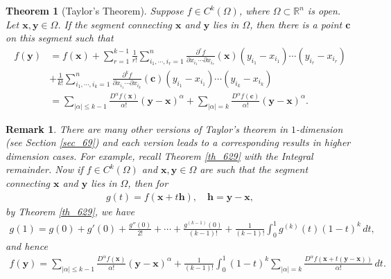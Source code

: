 \documentclass[11pt]{book}
\newtheorem{theorem}{Theorem}[chapter]
\newtheorem{remark}{Remark}[chapter]
\theoremstyle{definition}
\numberwithin{equation}{chapter}
\begin{document}
\begin{theorem}[Taylor's Theorem]\label{th_718}
Suppose $f \in C^k(\Omega)$, where $\Omega \subset \mathbb{R}^n$ is open. Let $\mathbf{x}, \mathbf{y} \in \Omega$. If the segment connecting $\mathbf{x}$ and $\mathbf{y}$ lies in $\Omega$, then there is a point $\mathbf{c}$ on this segment such that
\begin{align*}
    f(\mathbf{y}) & = f(\mathbf{x}) + \sum^{k-1}_{r=1} \frac{1}{r!} \sum^n_{i_1,\cdots,i_r=1} \frac{\partial^r f}{\partial x_{i_1} \cdots \partial x_{i_r}}(\mathbf{x}) (y_{i_1} - x_{i_1}) \cdots (y_{i_r} - x_{i_r}) \\
    & + \frac{1}{k!} \sum^n_{i_1,\cdots,i_k=1} \frac{\partial^k f}{\partial x_{i_1} \cdots \partial x_{i_k}}(\mathbf{c}) (y_{i_1} - x_{i_1}) \cdots (y_{i_k} - x_{i_k}) \\
    & = \sum_{\left|\alpha\right| \leq k - 1} \frac{D^{\alpha} f(\mathbf{x})}{\alpha!} (\mathbf{y} - \mathbf{x})^{\alpha} + \sum_{\left|\alpha\right| = k} \frac{D^{\alpha} f(\mathbf{c})}{\alpha!} (\mathbf{y} - \mathbf{x})^{\alpha}.
\end{align*}
\end{theorem}

\medskip

\begin{remark}
There are many other versions of Taylor's theorem in $1$-dimension (see Section \ref{sec_69}) and each version leads to a corresponding results in higher dimension cases. For example, recall Theorem \ref{th_629} with the Integral remainder. Now if $f \in C^k(\Omega)$ and $\mathbf{x}, \mathbf{y} \in \Omega$ are such that the segment connecting $\mathbf{x}$ and $\mathbf{y}$ lies in $\Omega$, then for
\begin{align*}
    g(t) = f(\mathbf{x} + t\mathbf{h}),  \quad \mathbf{h} = \mathbf{y} - \mathbf{x},
\end{align*}
by Theorem \ref{th_629}, we have
\begin{align*}
    g(1) = g(0) + g'(0) + \frac{g''(0)}{2!} + \cdots + \frac{g^{(k-1)}(0)}{(k-1)!} + \frac{1}{(k-1)!} \int^1_0 g^{(k)}(t) (1 - t)^k \,dt,
\end{align*}
and hence
\begin{align*}
    f(\mathbf{y}) = \sum_{\left|\alpha\right| \leq k - 1} \frac{D^{\alpha} f(\mathbf{x})}{\alpha!} (\mathbf{y} - \mathbf{x})^{\alpha} + \frac{1}{(k-1)!} \int^1_0 (1 - t)^k \sum_{\left|\alpha\right| = k} \frac{D^{\alpha} f(\mathbf{x} + t(\mathbf{y} - \mathbf{x}))}{\alpha!} \,dt.
\end{align*}
\end{remark}
\end{document}
